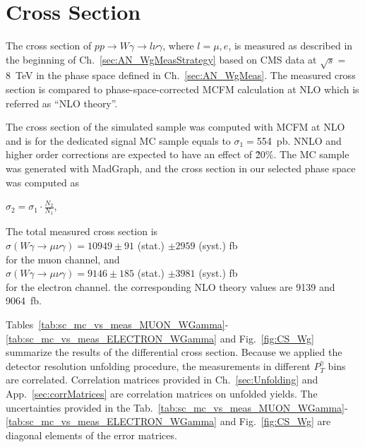 \section{Cross Section}
\label{sec:AN_CrossSection}

The cross section of $pp\rightarrow W\gamma \rightarrow l\nu\gamma$, where $l=\mu,e$, is measured as described in the beginning of Ch.~\ref{sec:AN_WgMeasStrategy} based on CMS data at $\sqrt{s}=$8~TeV in the phase space defined in  Ch.~\ref{sec:AN_WgMeas}. The measured cross section is compared to phase-space-corrected MCFM calculation at NLO which is referred as ``NLO theory''.  

The cross section of the simulated sample was computed with MCFM at NLO and is for the dedicated signal MC sample equals to $\sigma_1=$554~pb. NNLO and higher order corrections are expected to have an effect of \~20\%. The MC sample was generated with MadGraph, and the cross section in our selected phase space was computed as 

\begin{center}
$\sigma_2 = \sigma_1 \cdot \frac{N_2}{N_1}$, 
\end{center} 



The total measured cross section is \\
$\sigma(W\gamma\rightarrow\mu\nu\gamma)=10949 \pm 91$ (stat.) $ \pm 2959$ (syst.) fb\\
for the muon channel, and \\
$\sigma(W\gamma\rightarrow\mu\nu\gamma)=9146 \pm 185$ (stat.) $ \pm 3981$ (syst.) fb\\
for the electron channel. the corresponding NLO theory values are 9139 and 9064~fb.


Tables~\ref{tab:sc_mc_vs_meas_MUON_WGamma}-\ref{tab:sc_mc_vs_meas_ELECTRON_WGamma} and Fig.~\ref{fig:CS_Wg} summarize the results of the differential cross section. Because we applied the detector resolution unfolding procedure, the measurements in different $P_T^{\gamma}$ bins are correlated. Correlation matrices provided in Ch.~\ref{sec:Unfolding} and App.~\ref{sec:corrMatrices} are correlation matrices on unfolded yields. The uncertainties provided in the Tab.~\ref{tab:sc_mc_vs_meas_MUON_WGamma}-\ref{tab:sc_mc_vs_meas_ELECTRON_WGamma} and Fig.~\ref{fig:CS_Wg} are diagonal elements of the error matrices.

